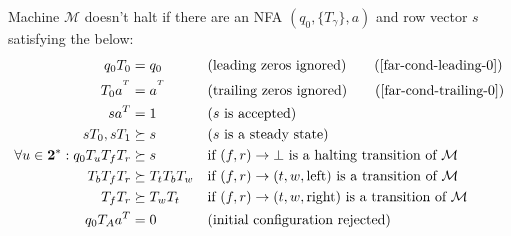 \begin{theorem}\normalfont
  \label{far-main-theorem}
  Machine $\mathcal{M}$ doesn't halt if there are an NFA $(q_0, \{T_\gamma\}, a)$ and row vector $s$ satisfying the below:
  \begin{align}
    \label{far-cond-first}
    q_0 T_0                                  & = q_0
                                             &                     & \text{(leading zeros ignored)}
    \tag{\ref{far-cond-leading-0}}
    \\
    T_0a^{\T}                                & = a^{\T}
                                             &                     & \text{(trailing zeros ignored)}
    \tag{\ref{far-cond-trailing-0}}
    \\
    sa\T                                     & = 1
                                             &                     & \text{($s$ is accepted)}
    \label{far-cond-ass-accepted}
    \\
    sT_0,sT_1                                & \succeq s
                                             &                     & \text{($s$ is a steady state)}
    \label{far-cond-ass-steady}
    \\
    \forall u\in\mathbf{2}^*: q_0T_u T_f T_r & \succeq s
                                             &                     & \text{if $(f,r) \to \bot$ is a halting transition of $\mathcal{M}$}
    \label{far-cond-halt}
    \\
    T_b T_f T_r                              & \succeq T_t T_b T_w
                                             &                     & \text{if $(f,r) \to (t,w,\text{left})$ is a transition of $\mathcal{M}$}
    \label{far-cond-left}
    \\
    T_f T_r                                  & \succeq T_w T_t
                                             &                     & \text{if $(f,r) \to (t,w,\text{right})$ is a transition of $\mathcal{M}$}
    \label{far-cond-last}
    \\
    q_0 T_A a\T                              & = 0
                                             &                     & \text{(initial configuration rejected)}
    \label{far-cond-reject-start}
  \end{align}
\end{theorem}


